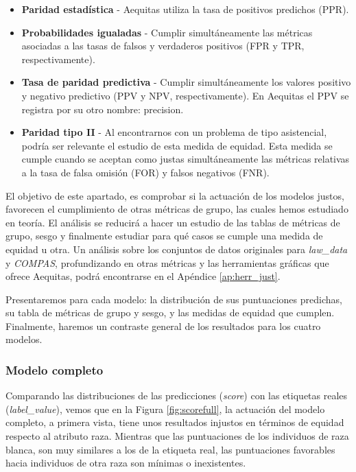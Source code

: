 \documentclass[oneside,openright,titlepage,numbers=noenddot,openany,headinclude,footinclude=true,
cleardoublepage=empty,abstractoff,BCOR=5mm,paper=a4,fontsize=12pt,main=spanish]{scrreprt}
\begin{document}
\begin{itemize}
    \item \textbf{Paridad estadística} - Aequitas utiliza la tasa de positivos predichos (PPR).
    \item \textbf{Probabilidades igualadas} - Cumplir simultáneamente las métricas asociadas a las tasas de falsos y verdaderos positivos (FPR y TPR, respectivamente).
    \item \textbf{Tasa de paridad predictiva} - Cumplir simultáneamente los valores positivo y negativo predictivo (PPV y NPV, respectivamente). En Aequitas el PPV se registra por su otro nombre: precision.
    \clearpage
    \item \textbf{Paridad tipo II} - Al encontrarnos con un problema de tipo asistencial, podría ser relevante el estudio de esta medida de equidad. Esta medida se cumple cuando se aceptan como justas simultáneamente las métricas relativas a la tasa de falsa omisión (FOR) y falsos negativos (FNR).
\end{itemize}

El objetivo de este apartado, es comprobar si la actuación de los modelos justos, favorecen el cumplimiento de otras métricas de grupo, las cuales hemos estudiado en teoría. El análisis se reducirá a hacer un estudio de las tablas de métricas de grupo, sesgo y finalmente estudiar para qué casos se cumple una medida de equidad u otra. Un análisis sobre los conjuntos de datos originales para \textit{law\_data} y \textit{COMPAS}, profundizando en otras métricas y las herramientas gráficas que ofrece Aequitas, podrá encontrarse en el Apéndice \ref{ap:herr_just}.

Presentaremos para cada modelo: la distribución de sus puntuaciones predichas, su tabla de métricas de grupo y sesgo, y las medidas de equidad que cumplen. Finalmente, haremos un contraste general de los resultados para los cuatro modelos.

\subsubsection*{Modelo completo}

Comparando las distribuciones de las predicciones (\textit{score}) con las etiquetas reales (\textit{label\_value}), vemos que en la Figura \ref{fig:scorefull}, la actuación del modelo completo, a primera vista, tiene unos resultados injustos en términos de equidad respecto al atributo raza. Mientras que las puntuaciones de los individuos de raza blanca, son muy similares a los de la etiqueta real, las puntuaciones favorables hacia individuos de otra raza son mínimas o inexistentes.\\
\end{document}
